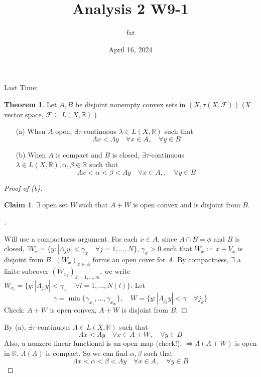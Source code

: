 \documentclass{article}
\title{Analysis 2 W9-1}
\author{fat}
\date{April 16, 2024}
\theoremstyle{definition}
\newtheorem{thm}{Theorem}
\newtheorem*{clm}{Claim}
\newenvironment{proofs}[1][\proofname]{%
  \begin{proof}[#1]$ $\par\nobreak\ignorespaces
}{%
  \end{proof}
}
\newcommand{\F}{\mathcal F}
\newcommand{\RR}{\mathbb R}
\newcommand{\Ra}{\Rightarrow}
\begin{document}
\maketitle
\thispagestyle{fancy}
\renewcommand{\footrulewidth}{0.4pt}
\cfoot{\thepage}
\renewcommand{\headrulewidth}{0.4pt}

\noindent Last Time:
\begin{thm}
	Let $A, B$ be disjoint nonempty convex sets in $(X, \tau(X, \F))$ ($X$ vector space, $\F \subseteq L(X, \RR)$.)
	\begin{enumerate}
		\item[(a)] When $A$ open, $\exists \tau$-continuous $\lambda \in L(X, \RR)$ such that
			\[
				\Lambda x < \Lambda y \quad \forall x \in A, \quad \forall y \in B
			\]

		\item[(b)] When $A$ is compact and $B$ is closed, $\exists \tau$-continuous $\lambda \in L(X, \RR), \alpha, \beta \in \RR$ such that
			\[
				\Lambda x < \alpha < \beta < \Lambda y \quad \forall x \in A,, \quad \forall y \in B
			\]
	\end{enumerate}
\end{thm}

\begin{proofs}[Proof of (b)]
	\begin{clm}
		$\exists$ open set $W$ such that $A + W$ is open convex and is disjoint from $B$.
	\end{clm}

	\begin{proofs}
		Will use a compactness argument.
		For each $x \in A$, since $A \cap B = \phi$ and $B$ is closed, $\exists V_x = \{y: |\Lambda_j y| < \gamma_x \quad \forall j = 1, ..., N\}$, $\gamma_x > 0$ such that $W_x := x + V_x$ is disjoint from $B$.
		$(W_x)_{x \in A}$ forms an open cover for $A$.
		By compactness, $\exists$ a finite subcover $(W_{x_k})_{k = 1, ..., m}$, we write $W_{x_l} = \{y: |\Lambda_{j_l} y| < \gamma_{x_l} \quad \forall l = 1, ..., N(l)\}$.
		Let 
		\[
			\gamma = \min\{\gamma_{x_1}, ..., \gamma_{x_m}\}, \quad W = \{y: |\Lambda_{j_k} y| < \gamma \quad \forall j_k\}
		\]
		Check: $A + W$ is open convex, $A + W$ is disjoint from $B$.
	\end{proofs}
	By (a), $\exists \tau$-continuous $\Lambda \in L(X, \RR)$ such that
	\[
		\Lambda x < \Lambda y \quad \forall x \in A + W, \quad \forall y \in B
	\]
	Also, a nonzero linear functional is an open map (check!).
	$\Ra \Lambda(A + W)$ is open in $\RR$.
	$\Lambda(A)$ is compact.
	So we can find $\alpha, \beta$ such that
	\[
		\Lambda x < \alpha < \beta < \Lambda y \quad \forall x \in A, \quad \forall y \in B
	\]
\end{proofs}
\end{document}
